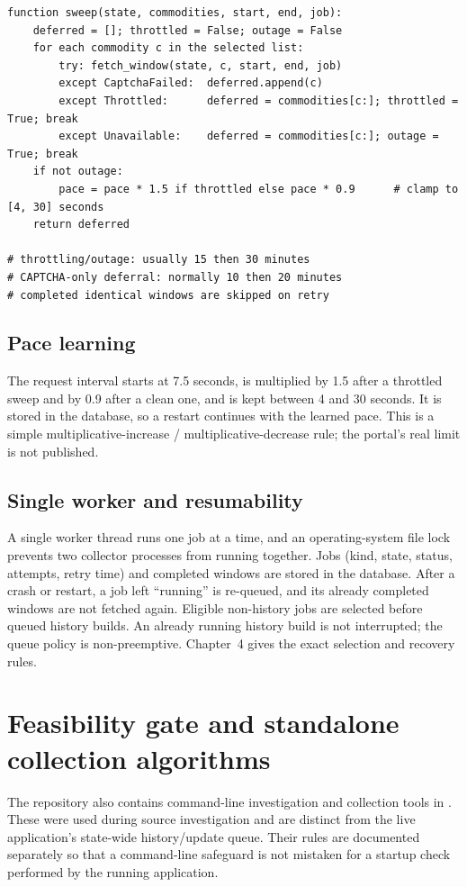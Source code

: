 \documentclass[12pt,a4paper,oneside]{report}
\numberwithin{equation}{chapter}
\numberwithin{figure}{chapter}
\numberwithin{table}{chapter}
\theoremstyle{definition}
\begin{document}
\begin{lstlisting}[caption={Sweep over commodities with deferral and pace adaptation}]
function sweep(state, commodities, start, end, job):
    deferred = []; throttled = False; outage = False
    for each commodity c in the selected list:
        try: fetch_window(state, c, start, end, job)
        except CaptchaFailed:  deferred.append(c)
        except Throttled:      deferred = commodities[c:]; throttled = True; break
        except Unavailable:    deferred = commodities[c:]; outage = True; break
    if not outage:
        pace = pace * 1.5 if throttled else pace * 0.9      # clamp to [4, 30] seconds
    return deferred

# throttling/outage: usually 15 then 30 minutes
# CAPTCHA-only deferral: normally 10 then 20 minutes
# completed identical windows are skipped on retry
\end{lstlisting}

\subsection{Pace learning}
The request interval starts at 7.5 seconds, is multiplied by 1.5 after a throttled sweep and by 0.9 after a clean one, and is kept between 4 and 30 seconds. It is stored in the database, so a restart continues with the learned pace. This is a simple multiplicative-increase / multiplicative-decrease rule; the portal's real limit is not published.

\subsection{Single worker and resumability}
A single worker thread runs one job at a time, and an operating-system file lock prevents two collector processes from running together. Jobs (kind, state, status, attempts, retry time) and completed windows are stored in the database. After a crash or restart, a job left ``running'' is re-queued, and its already completed windows are not fetched again. Eligible non-history jobs are selected before queued history builds. An already running history build is not interrupted; the queue policy is non-preemptive. Chapter~4 gives the exact selection and recovery rules.

\section{Feasibility gate and standalone collection algorithms}
The repository also contains command-line investigation and collection tools in . These were used during source investigation and are distinct from the live application's state-wide history/update queue. Their rules are documented separately so that a command-line safeguard is not mistaken for a startup check performed by the running application.
\end{document}
